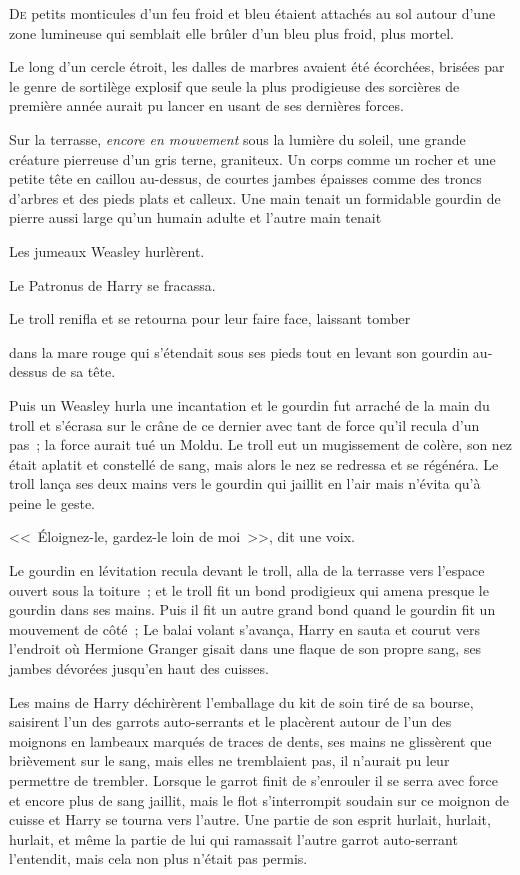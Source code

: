 
\lettrine{D}{e} petits monticules d'un feu froid et bleu étaient attachés au sol autour d'une zone lumineuse qui semblait elle brûler d'un bleu plus froid, plus mortel.

Le long d'un cercle étroit, les dalles de marbres avaient été écorchées, brisées par le genre de sortilège explosif que seule la plus prodigieuse des sorcières de première année aurait pu lancer en usant de ses dernières forces.

Sur la terrasse, \emph{encore en mouvement} sous la lumière du soleil, une grande créature pierreuse d'un gris terne, graniteux. Un corps comme un rocher et une petite tête en caillou au-dessus, de courtes jambes épaisses comme des troncs d'arbres et des pieds plats et calleux. Une main tenait un formidable gourdin de pierre aussi large qu'un humain adulte et l'autre main tenait

Les jumeaux Weasley hurlèrent.

Le Patronus de Harry se fracassa.

Le troll renifla et se retourna pour leur faire face, laissant tomber

dans la mare rouge qui s'étendait sous ses pieds tout en levant son gourdin au-dessus de sa tête.

Puis un Weasley hurla une incantation et le gourdin fut arraché de la main du troll et s'écrasa sur le crâne de ce dernier avec tant de force qu'il recula d'un pas~; la force aurait tué un Moldu. Le troll eut un mugissement de colère, son nez était aplatit et constellé de sang, mais alors le nez se redressa et se régénéra. Le troll lança ses deux mains vers le gourdin qui jaillit en l'air mais n'évita qu'à peine le geste.

<<~Éloignez-le, gardez-le loin de moi~>>, dit une voix.

Le gourdin en lévitation recula devant le troll, alla de la terrasse vers l'espace ouvert sous la toiture~; et le troll fit un bond prodigieux qui amena presque le gourdin dans ses mains. Puis il fit un autre grand bond quand le gourdin fit un mouvement de côté~; Le balai volant s'avança, Harry en sauta et courut vers l'endroit où Hermione Granger gisait dans une flaque de son propre sang, ses jambes dévorées jusqu'en haut des cuisses.

Les mains de Harry déchirèrent l'emballage du kit de soin tiré de sa bourse, saisirent l'un des garrots auto-serrants et le placèrent autour de l'un des moignons en lambeaux marqués de traces de dents, ses mains ne glissèrent que brièvement sur le sang, mais elles ne tremblaient pas, il n'aurait pu leur permettre de trembler. Lorsque le garrot finit de s'enrouler il se serra avec force et encore plus de sang jaillit, mais le flot s'interrompit soudain sur ce moignon de cuisse et Harry se tourna vers l'autre. Une partie de son esprit hurlait, hurlait, hurlait, et même la partie de lui qui ramassait l'autre garrot auto-serrant l'entendit, mais cela non plus n'était pas permis.

